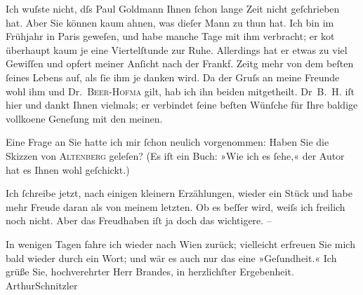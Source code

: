 \pstart
           Ich wuſste nicht, dſs Paul Goldmann Ihnen{ }ſchon lange Zeit nicht geſchrieben hat. Aber Sie können kaum ahnen, was dieſer Mann
               zu thun hat. Ich bin im Frühjahr in Paris
               geweſen, und habe manche Tage mit ihm verbracht; er ko{\geminationm}t
               überhaupt kaum je eine Viertelſtunde zur Ruhe. Allerdings hat er etwas zu viel
               Gewiſſen und opfert meiner An{\pb}ſicht nach der Frankf. Zeitg mehr von dem beſten{ }ſeines Lebens
               auf, als{ }ſie ihm je danken wird. Da der Gruſs an meine Freunde wohl ihm und Dr. \textsc{Beer-Hofma{\geminationn}} gilt, hab ich ihn beiden mitgetheilt. Dr \textsc{B. H.} iſt hier und dankt Ihnen vielmals; er verbindet{ }ſeine beſten Wünſche für Ihre
               baldige vollko{\geminationm}ene Geneſung mit den meinen.\pend
           
\pstart
           {\pb}Eine Frage an Sie hatte ich mir{ }ſchon neulich
               vorgenommen: Haben Sie die Skizzen von \textsc{Altenberg} geleſen? (Es iſt ein Buch: »Wie ich es{ }ſehe,« der Autor hat es Ihnen wohl geſchickt.)\pend
           
\pstart
           Ich{ }ſchreibe jetzt, nach einigen kleinern Erzählungen, wieder ein Stück und habe mehr
               Freude daran als von meinem letzten. Ob es beſſer wird,  weiſs ich freilich {\pb}noch nicht. Aber
               das Freudhaben iſt ja doch das wichtigere. –\pend
           
\pstart
           In wenigen Tagen fahre ich wieder nach Wien
               zurück; vielleicht erfreuen Sie mich bald wieder durch ein Wort; und wär es auch nur
               das eine »Geſundheit.«\pend
           \pstart Ich grüße Sie, hochverehrter Herr Brandes, in herzlichſter Ergebenheit.
                  \spacefill\mbox{ArthurSchnitzler}\pend{}\endnumbering{}  \newcommand{\dateiname}{L00705}\newcommand{\titel}{Arthur Schnitzler an Georg Brandes, 18. 7. 1897}\newcommand{\editorInnen}{Martin Anton Müller und Gerd-Hermann Susen}
